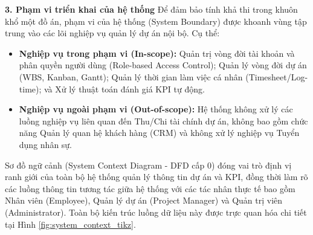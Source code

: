 \documentclass[a4paper,13.5pt]{extreport}
\begin{document}
\textbf{3. Phạm vi triển khai của hệ thống}
Để đảm bảo tính khả thi trong khuôn khổ một đồ án, phạm vi của hệ thống (System Boundary) được khoanh vùng tập trung vào các lõi nghiệp vụ quản lý dự án nội bộ. Cụ thể:
\begin{itemize}
    \item \textbf{Nghiệp vụ trong phạm vi (In-scope):} Quản trị vòng đời tài khoản và phân quyền người dùng (Role-based Access Control); Quản lý vòng đời dự án (WBS, Kanban, Gantt); Quản lý thời gian làm việc cá nhân (Timesheet/Log-time); và Xử lý thuật toán đánh giá KPI tự động.
    \item \textbf{Nghiệp vụ ngoài phạm vi (Out-of-scope):} Hệ thống không xử lý các luồng nghiệp vụ liên quan đến Thu/Chi tài chính dự án, không bao gồm chức năng Quản lý quan hệ khách hàng (CRM) và không xử lý nghiệp vụ Tuyển dụng nhân sự.
\end{itemize}

Sơ đồ ngữ cảnh (System Context Diagram - DFD cấp 0) đóng vai trò định vị ranh giới của toàn bộ hệ thống quản lý thông tin dự án và KPI, đồng thời làm rõ các luồng thông tin tương tác giữa hệ thống với các tác nhân thực tế bao gồm Nhân viên (Employee), Quản lý dự án (Project Manager) và Quản trị viên (Administrator). Toàn bộ kiến trúc luồng dữ liệu này được trực quan hóa chi tiết tại Hình \ref{fig:system_context_tikz}.
\end{document}
